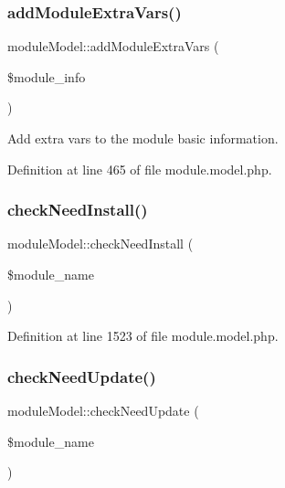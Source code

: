 \subsubsection{\texorpdfstring{add\+Module\+Extra\+Vars()}{addModuleExtraVars()}}
{\footnotesize\ttfamily module\+Model\+::add\+Module\+Extra\+Vars (\begin{DoxyParamCaption}\item[{}]{\$module\+\_\+info }\end{DoxyParamCaption})}



Add extra vars to the module basic information. 



Definition at line 465 of file module.\+model.\+php.

\hypertarget{classmoduleModel_a0a2303f1634b4937509e9b21e811d1ad}{}\label{classmoduleModel_a0a2303f1634b4937509e9b21e811d1ad} 
\subsubsection{\texorpdfstring{check\+Need\+Install()}{checkNeedInstall()}}
{\footnotesize\ttfamily module\+Model\+::check\+Need\+Install (\begin{DoxyParamCaption}\item[{}]{\$module\+\_\+name }\end{DoxyParamCaption})}



Definition at line 1523 of file module.\+model.\+php.

\hypertarget{classmoduleModel_adb7f7c6facce819f69ae5e29db2018cc}{}\label{classmoduleModel_adb7f7c6facce819f69ae5e29db2018cc} 
\subsubsection{\texorpdfstring{check\+Need\+Update()}{checkNeedUpdate()}}
{\footnotesize\ttfamily module\+Model\+::check\+Need\+Update (\begin{DoxyParamCaption}\item[{}]{\$module\+\_\+name }\end{DoxyParamCaption})}



